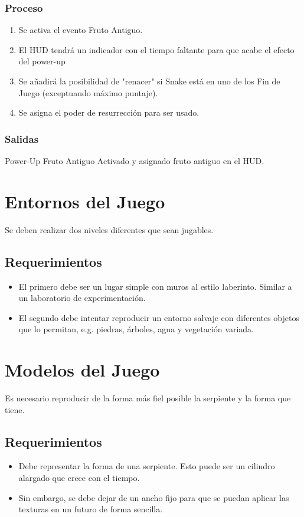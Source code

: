 \documentclass[letterpaper]{scrreprt}
\begin{document}
\subsubsection{Proceso}
\begin{enumerate}
	\item Se activa el evento Fruto Antiguo.
	\item El HUD tendrá un indicador con el tiempo faltante para que acabe el efecto del power-up
	\item Se añadirá la posibilidad de "renacer" si Snake está en uno de los Fin de Juego (exceptuando máximo puntaje).
	\item Se asigna el poder de resurrección para ser usado.
\end{enumerate}
\subsubsection{Salidas}
Power-Up Fruto Antiguo Activado y asignado fruto antiguo en el HUD.


\section{Entornos del Juego}
Se deben realizar dos niveles diferentes que sean jugables.
\subsection{Requerimientos}
\begin{itemize}
	\item El primero debe ser un lugar simple con muros al estilo laberinto. Similar a un laboratorio de experimentación.
	\item El segundo debe intentar reproducir un entorno salvaje con diferentes objetos que lo permitan, e.g. piedras, árboles, agua y vegetación variada.
\end{itemize}


\section{Modelos del Juego}
Es necesario reproducir de la forma más fiel posible la serpiente y la forma que tiene. 
\subsection{Requerimientos}
\begin{itemize}
	\item Debe representar la forma de una serpiente. Esto puede ser un cilindro alargado que crece con el tiempo.
	\item Sin embargo, se debe dejar de un ancho fijo para que se puedan aplicar las texturas en un futuro de forma sencilla.
\end{itemize}
\end{document}
